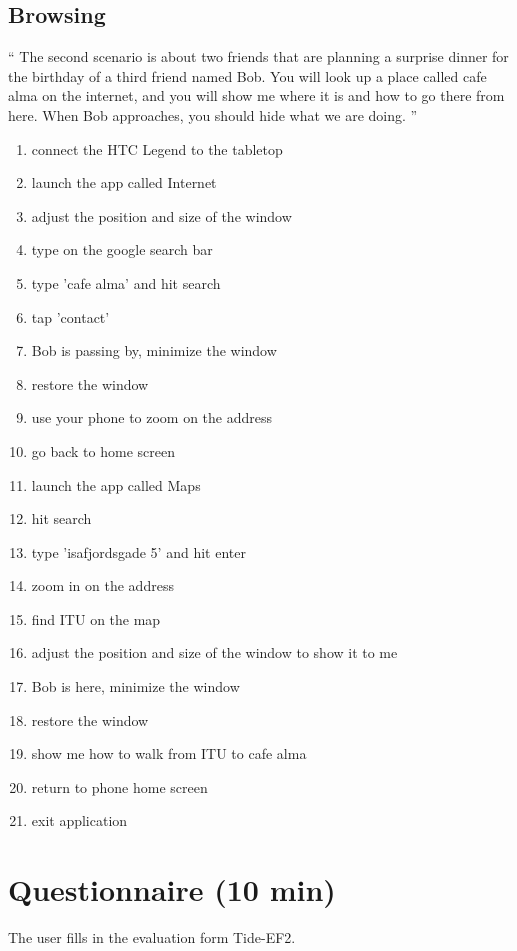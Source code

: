 \documentclass[11pt]{amsart}
\begin{document}
\subsection{Browsing}

``
The second scenario is about two friends that are planning a surprise dinner for the birthday of a third friend named Bob. 
You will look up a place called cafe alma on the internet, and you will show me where it is and how to go there from here.
When Bob approaches, you should hide what we are doing.
''

\begin{enumerate}
\item connect the HTC Legend to the tabletop
\item launch the app called Internet
\item adjust the position and size of the window
\item type on the google search bar
\item type 'cafe alma' and hit search
\item tap 'contact'
\item Bob is passing by, minimize the window
\item restore the window
\item use your phone to zoom on the address
\item go back to home screen
\item launch the app called Maps
\item hit search
\item type 'isafjordsgade 5' and hit enter
\item zoom in on the address
\item find ITU on the map
\item adjust the position and size of the window to show it to me
\item Bob is here, minimize the window
\item restore the window
\item show me how to walk from ITU to cafe alma
\item return to phone home screen
\item exit application
\end{enumerate}

\section{Questionnaire (10 min)}

The user fills in the evaluation form Tide-EF2.
\end{document}
